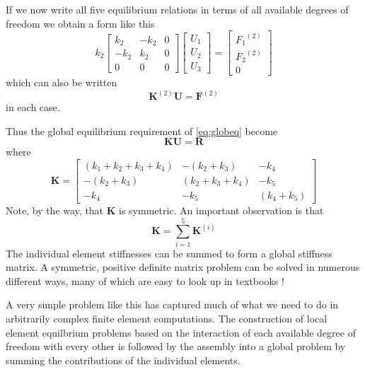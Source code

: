 \documentclass[10pt]{article}
\begin{document}
	If we now write all five equilibrium relations in terms of all available degrees of 
	freedom we obtain a form like this
		\begin{equation}
				k_2	\left[  \begin{array}{ccc}  k_2 & -k_2 & 0  \\ -k_2 & k_2 & 0 \\ 0 & 0 & 0 \end{array} \right]
						\left[		\begin{array}{c} U_1 \\ U_2 \\ U_3 \end{array} \right] = 
						\left[		\begin{array}{c} {F_1}^{(2)} \\ {F_2}^{(2)} \\ 0\end{array} \right] 
		\end{equation}
	which can also be written
		\begin{equation}
			\mathbf{K}^{(2)}\mathbf{U} = \mathbf{F}^{(2)}
		\end{equation}
	in each case.
	
	Thus the global equilibrium requirement of \ref{eq:globeq} become
		\begin{equation}
			\mathbf{K}\mathbf{U} = \mathbf{R}
		\end{equation}
	where
		\begin{equation}
			\mathbf{K} = \left[
			\begin{array}{ccc}
				(k_1 + k_2 +k_3 + k_4) & -(k_2+k_3) & -k_4 \\
				-(k_2+k_3) & (k_2 + k_3+k_4) & -k_5 \\
				-k_4 & -k_5 & (k_4 + k_5)
			\end{array}
			\right]
		\end{equation}	
	Note, by the way, that $ \mathbf{K}$ is symmetric.
	An important observation is that 
		\begin{equation}
			\mathbf{K} = \sum_{i=1}^{5} \mathbf{K}^{(i)}
		\end{equation}
	The individual element stiffnesses can be summed to form a
	global stiffness matrix. A symmetric, positive definite
	matrix problem can be solved in numerous different ways, many
	of which are easy to look up in textbooks !

	A very simple problem like this has captured much of what
	we need to do in arbitrarily complex finite element computations.
	The construction of local element equilbrium problems based
	on the interaction of each available degree of freedom with
	every other is followed by the assembly into a 
	global problem by summing the contributions of the individual 
	elements.
	
\end{document}
